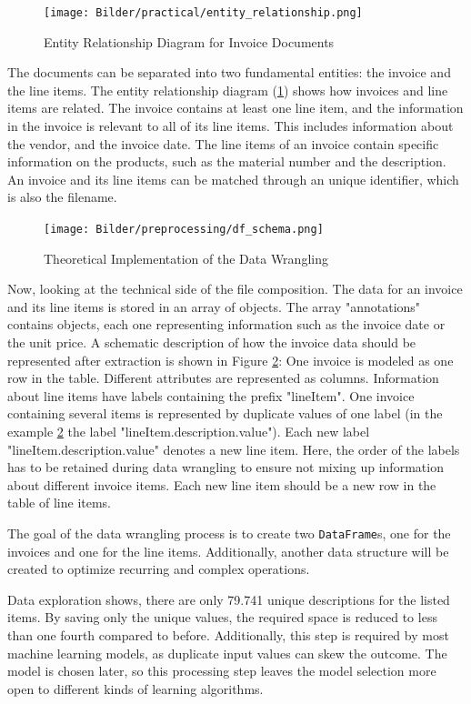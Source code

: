     \begin{figure}[ht]
        \centering
        \texttt{[image: Bilder/practical/entity\_relationship.png]}
        \caption{Entity Relationship Diagram for Invoice Documents}
        \label{fig:er}
    \end{figure}
	The documents can be separated into two fundamental entities: the invoice and the line items. The entity relationship diagram (\ref{fig:er}) shows how invoices and line items are related. The invoice contains at least one line item, and the information in the invoice is relevant to all of its line items. This includes information about the vendor, and the invoice date. The line items of an invoice contain specific information on the products, such as the material number and the description.
	An invoice and its line items can be matched through an unique identifier, which is also the filename.

	 \begin{figure}[ht]
		\centering
		\texttt{[image: Bilder/preprocessing/df\_schema.png]}
		\caption{Theoretical Implementation of the Data Wrangling}
		\label{fig:invoice_df_schema}
	\end{figure}	

	Now, looking at the technical side of the file composition.	The data for an invoice and its line items is stored in an array of objects. The array "annotations" contains objects, each one representing information such as the invoice date or the unit price. A schematic description of how the invoice data should be represented after extraction is shown in Figure \ref{fig:invoice_df_schema}: One invoice is modeled as one row in the table. Different attributes are represented as columns.
	Information about line items have labels containing the prefix "lineItem". One invoice containing several items is represented by duplicate values of one label (in the example \ref{fig:invoice_df_schema} the label "lineItem.description.value"). Each new label "lineItem.description.value" denotes a new line item. Here, the order of the labels has to be retained during data wrangling to ensure not mixing up information about different invoice items. Each new line item should be a new row in the table of line items.
	
	The goal of the data wrangling process is to create two \lstinline|DataFrame|s, one for the invoices and one for the line items.
	Additionally, another data structure will be created to optimize recurring and complex operations.
	
	Data exploration shows, there are only 79.741 unique descriptions for the listed items. By saving only the unique values, the required space is reduced to less than one fourth compared to before. Additionally, this step is required by most machine learning models, as duplicate input values can skew the outcome. The model is chosen later, so this processing step leaves the model selection more open to different kinds of learning algorithms.
	
